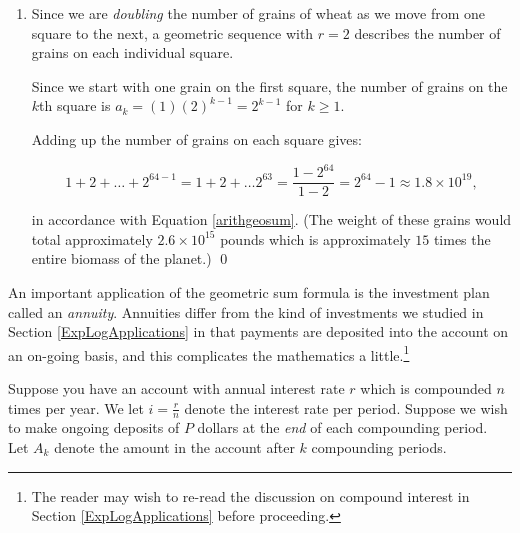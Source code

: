 \documentclass{ximera}
\begin{document}
\begin{example}
\begin{enumerate}
\begin{enumerate}
As a side note, the special case:  $1 + 2 + 3 + \ldots + 100$ was allegedly given to  \href{http://en.wikipedia.org/wiki/Carl_Friedrich_Gauss}{\underline{Carl  Friedrich Gauss}}  while he was in  elementary school.  Instead of computing the sum in a brute force method, he arrived at the answer by grouping $1+99 = 100$, $2+98 = 100$, etc.  so that he had $50$ groups of $100$ with $50$ left over for a total of $5050$.  This is the exact same methodology we used to prove the sum of the arithmetic sequence formula in Equation \ref{arithgeosum}.

\end{enumerate}

\item Since we are \textit{doubling} the number of grains of wheat as we move from one square to the next, a geometric sequence with $r=2$ describes the number of grains on each individual square.  

Since we start with one grain on the first square, the number of grains on the $k$th square is $a_{k} = (1) (2)^{k-1} = 2^{k-1}$ for $k \geq 1$.  

Adding up the number of grains on each square gives:

\[1 + 2 + \ldots + 2^{64-1} = 1 + 2 + \ldots 2^{63} = \frac{1-2^{64}}{1-2} = 2^{64} - 1 \approx 1.8 \times 10^{19},\] 

in accordance with Equation \ref{arithgeosum}. (The weight of these grains would total approximately $2.6 \times 10^{15}$ pounds which is approximately $15$ times the entire biomass of the planet.) \qed

\end{enumerate}

\end{example}


 

An important application of the geometric sum formula is the investment plan called an  \textit{annuity}. Annuities differ from the kind of investments we studied in Section \ref{ExpLogApplications} in that payments are deposited into the account on an on-going basis, and this complicates the mathematics a little.\footnote{The reader may wish to re-read the discussion on compound interest in Section \ref{ExpLogApplications} before proceeding.} 


Suppose you have an account with annual interest rate $r$ which is compounded $n$ times per year.  We let $i = \frac{r}{n}$ denote the interest rate  per period.  Suppose we wish to make ongoing deposits of $P$ dollars at the \textit{end} of each compounding period.  Let $A_{k}$ denote the amount in the account after $k$ compounding periods.  
\end{document}
